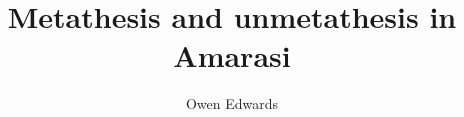 \title{Metathesis and unmetathesis in Amarasi} 
\dedication{For Chuck and Om Roni who laid the groundwork in analysing Amarasi.
						The giants on whose shoulders I stand.}
\author{Owen Edwards}
\renewcommand{\lsSeries}{sidl} %
\renewcommand{\lsSeriesNumber}{} %
\renewcommand{\lsID}{228}

 
 
 
 
  
